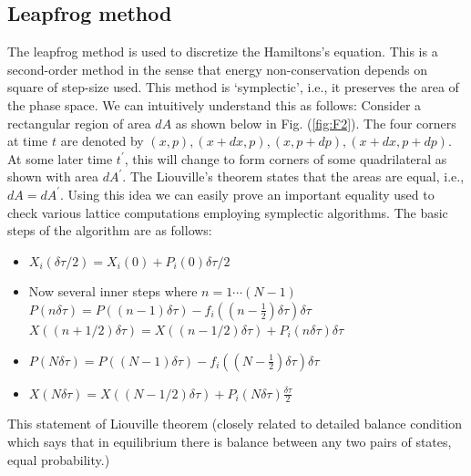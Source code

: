 \documentclass[11pt]{article}
\begin{document}
\subsection{Leapfrog method}

The leapfrog method is used to discretize the Hamiltons's equation. This is a second-order method in the sense that energy non-conservation depends on square of step-size used. This method is `symplectic', i.e., it preserves the area of the phase space. 
We can intuitively understand this as follows: 
Consider a rectangular region of area $dA$ as shown below in Fig. (\ref{fig:F2}). The four corners at time $t$ are denoted by $(x, p), (x + dx, p), (x, p + dp), (x + dx, p + dp)$. At some later time $t^{\prime}$, this will change to form corners of some quadrilateral 
as shown with area $dA^{\prime}$. 
The Liouville's theorem states that the areas are equal, i.e., $dA = dA^{\prime}$. 
Using this idea we can easily prove an important equality used to check various lattice computations employing symplectic algorithms. The basic steps of the algorithm are as follows:

\begin{itemize}
	\item $X_{i}(\delta \tau/2) = X_{i}(0) + P_{i}(0)\delta \tau/2$
	\item Now several inner steps where $n =  1 \cdots (N-1)$
	\subitem $P(n \delta \tau) = P((n-1) \delta \tau) - f_{i}((n-\frac{1}{2}) \delta \tau) \delta \tau$ 
	\subitem $X((n + 1/2) \delta \tau) = X((n - 1/2) \delta \tau) + P_{i}(n \delta \tau) \delta \tau$
	\item $P(N \delta \tau) = P((N-1) \delta \tau) - f_{i}((N-\frac{1}{2}) \delta \tau) \delta \tau$ 
	\item $X(N \delta \tau) = X((N - 1/2) \delta \tau) + P_{i}(N \delta \tau) \frac{\delta \tau}{2}$ 
	
\end{itemize} 

This statement of Liouville theorem (closely related to detailed balance condition which says that in equilibrium
there is balance between any two pairs of states, equal probability.)




\end{document}
